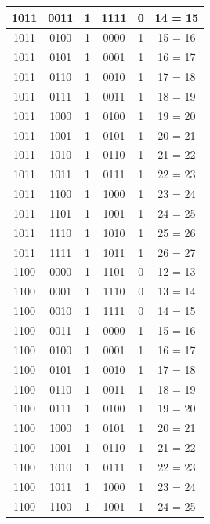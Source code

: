 \documentclass{exam}
\begin{document}
\begin{center}
\begin{longtable}{|c|c|c|c|c|c|}
                1011 & 0011 & 1 & 1111 & 0 & 14 = 15 \\ \hline
                1011 & 0100 & 1 & 0000 & 1 & 15 = 16 \\ \hline
                1011 & 0101 & 1 & 0001 & 1 & 16 = 17 \\ \hline
                1011 & 0110 & 1 & 0010 & 1 & 17 = 18 \\ \hline
                1011 & 0111 & 1 & 0011 & 1 & 18 = 19 \\ \hline
                1011 & 1000 & 1 & 0100 & 1 & 19 = 20 \\ \hline
                1011 & 1001 & 1 & 0101 & 1 & 20 = 21 \\ \hline
                1011 & 1010 & 1 & 0110 & 1 & 21 = 22 \\ \hline
                1011 & 1011 & 1 & 0111 & 1 & 22 = 23 \\ \hline
                1011 & 1100 & 1 & 1000 & 1 & 23 = 24 \\ \hline
                1011 & 1101 & 1 & 1001 & 1 & 24 = 25 \\ \hline
                1011 & 1110 & 1 & 1010 & 1 & 25 = 26 \\ \hline
                1011 & 1111 & 1 & 1011 & 1 & 26 = 27 \\ \hline
                1100 & 0000 & 1 & 1101 & 0 & 12 = 13 \\ \hline
                1100 & 0001 & 1 & 1110 & 0 & 13 = 14 \\ \hline
                1100 & 0010 & 1 & 1111 & 0 & 14 = 15 \\ \hline
                1100 & 0011 & 1 & 0000 & 1 & 15 = 16 \\ \hline
                1100 & 0100 & 1 & 0001 & 1 & 16 = 17 \\ \hline
                1100 & 0101 & 1 & 0010 & 1 & 17 = 18 \\ \hline
                1100 & 0110 & 1 & 0011 & 1 & 18 = 19 \\ \hline
                1100 & 0111 & 1 & 0100 & 1 & 19 = 20 \\ \hline
                1100 & 1000 & 1 & 0101 & 1 & 20 = 21 \\ \hline
                1100 & 1001 & 1 & 0110 & 1 & 21 = 22 \\ \hline
                1100 & 1010 & 1 & 0111 & 1 & 22 = 23 \\ \hline
                1100 & 1011 & 1 & 1000 & 1 & 23 = 24 \\ \hline
                1100 & 1100 & 1 & 1001 & 1 & 24 = 25 \\ \hline

\end{longtable}
\end{center}
\end{document}
